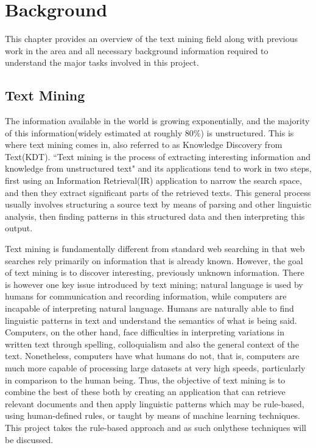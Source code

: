 \chapter{Background}
\label{cha:background}
This chapter provides an overview of the text mining field along with previous work in the area and all necessary background information required to understand the major tasks involved in this project.

\section{Text Mining}
\label{sec:textmining}
The information available in the world is growing exponentially, and the majority of this information(widely estimated at roughly 80\%) is unstructured. This is where text mining comes in, also referred to as Knowledge Discovery from Text(KDT).
``Text mining is the process of extracting interesting information and knowledge from unstructured text"\cite{hotho-etal-ldv-2005} and its applications tend to work in two steps, first using an Information Retrieval(IR) application to narrow the search space, and then they extract significant parts of the retrieved texts\cite{Polajnar2006}. This general process usually involves structuring a source text by means of parsing and other linguistic analysis, then finding patterns in this structured data and then interpreting this output.

Text mining is fundamentally different from standard web searching in that web searches rely primarily on information that is already known. However, the goal of text mining is to discover interesting, previously unknown information\cite{Gupta_Lehal_2009}.
There is however one key issue introduced by text mining; natural language is used by humans for communication and recording information, while computers are incapable of interpreting natural language. Humans are naturally able to find linguistic patterns in text and understand the semantics of what is being said. Computers, on the other hand, face difficulties in interpreting variations in written text through spelling, colloquialism and also the general context of the text. Nonetheless, computers have what humans do not, that is, computers are much more capable of processing large datasets at very high speeds, particularly in comparison to the human being. Thus, the objective of text mining is to combine the best of these both by creating an application that can retrieve relevant documents and then apply linguistic patterns which may be rule-based, using human-defined rules, or taught by means of machine learning techniques. This project takes the rule-based approach and as such onlythese techniques will be discussed.

